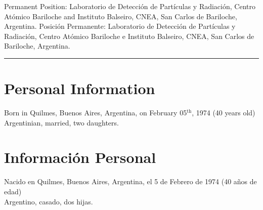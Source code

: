 
\ifeng
Permanent Position: Laboratorio de Detección de Partículas y Radiación, Centro Atómico Bariloche and Instituto Balseiro, CNEA, San Carlos de Bariloche, Argentina.
\else
Posición Permanente: Laboratorio de Detección de Partículas y Radiación, Centro Atómico Bariloche e Instituto Balseiro, CNEA, San Carlos de Bariloche, Argentina.
\fi

\hrule

\ifeng
\section*{Personal Information}
Born in Quilmes, Buenos Aires, Argentina, on February 05$^\mathrm{th}$, 1974 (40 years old)\\
Argentinian, married, two daughters.
\else
\section*{Información Personal}
Nacido en Quilmes, Buenos Aires, Argentina, el 5 de Febrero de 1974 (40 años de edad)\\
Argentino, casado, dos hijas.
\fi
